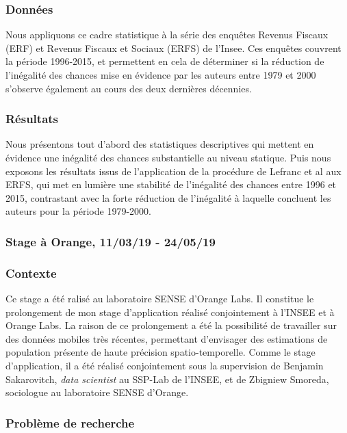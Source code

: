 \subsubsection*{Données}

Nous appliquons ce cadre statistique à la série des enquêtes Revenus Fiscaux (ERF) et Revenus Fiscaux et Sociaux (ERFS) de l'Insee. Ces enquêtes couvrent la période 1996-2015, et permettent en cela de déterminer si la réduction de l'inégalité des chances mise en évidence par les auteurs entre 1979 et 2000 s'observe également au cours des deux dernières décennies.

\subsubsection*{Résultats}

Nous présentons tout d'abord des statistiques descriptives qui mettent en évidence une inégalité des chances substantielle au niveau statique. Puis nous exposons les résultats issus de l'application de la procédure de Lefranc et al aux ERFS, qui met en lumière une stabilité de l'inégalité des chances entre 1996 et 2015, contrastant avec la forte réduction de l'inégalité à laquelle concluent les auteurs pour la période 1979-2000.

\subsubsection*{Stage à Orange, 11/03/19 - 24/05/19}

\subsubsection*{Contexte}

Ce stage a été ralisé au laboratoire SENSE d'Orange Labs. Il constitue le prolongement de mon stage d'application réalisé conjointement à l'INSEE et à Orange Labs. La raison de ce prolongement a été la possibilité de travailler sur des données mobiles très récentes, permettant d'envisager des estimations de population présente de haute précision spatio-temporelle. Comme le stage d'application, il a été réalisé conjointement sous la supervision de Benjamin Sakarovitch, \textit{data scientist} au SSP-Lab de l'INSEE, et de Zbigniew Smoreda, sociologue au laboratoire SENSE d'Orange.

\subsubsection*{Problème de recherche}

